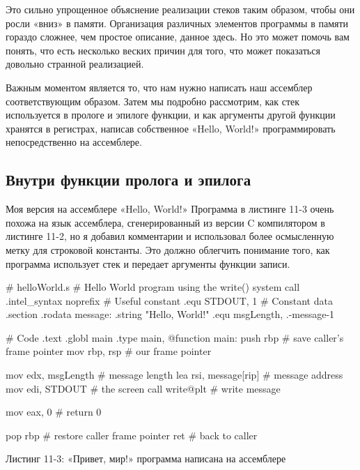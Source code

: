 Это сильно упрощенное объяснение реализации стеков таким образом, чтобы они росли «вниз» в памяти. Организация различных элементов программы в памяти гораздо сложнее, чем простое описание, данное здесь. Но это может помочь вам понять, что есть несколько веских причин для того, что может показаться довольно странной реализацией.

Важным моментом является то, что нам нужно написать наш ассемблер соответствующим образом. Затем мы подробно рассмотрим, как стек используется в прологе и эпилоге функции, и как аргументы другой функции хранятся в регистрах, написав собственное «Hello, World!» программировать непосредственно на ассемблере.

\subsection{Внутри функции пролога и эпилога}

Моя версия на ассемблере «Hello, World!» Программа в листинге 11-3 очень похожа на язык ассемблера, сгенерированный из версии C компилятором в листинге 11-2, но я добавил комментарии и использовал более осмысленную метку для строковой константы. Это должно облегчить понимание того, как программа использует стек и передает аргументы функции записи.

\begin{ffcode}
# helloWorld.s
# Hello World program using the write() system call
        .intel_syntax noprefix
# Useful constant
        .equ    STDOUT, 1
# Constant data       
        .section  .rodata       
message:
        .string "Hello, World!\n"
        .equ    msgLength, .-message-1

# Code
        .text
        .globl  main
        .type   main, @function
main:
        push    rbp                 # save caller's frame pointer
        mov     rbp, rsp            # our frame pointer

        mov     edx, msgLength      # message length       
        lea     rsi, message[rip]   # message address
        mov     edi, STDOUT         # the screen
        call    write@plt           # write message

        mov     eax, 0              # return 0

        pop     rbp                 # restore caller frame pointer
        ret                         # back to caller
\end{ffcode}

\begin{center}
Листинг 11-3: «Привет, мир!» программа написана на ассемблере
\end{center}

